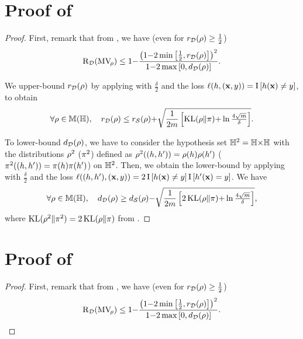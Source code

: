 \begin{noaddcontents}
\section{Proof of~}
\label{ap:mv:sec:proof-cbound-mcallester}

\theoremcboundmcallester*
\begin{proof}
First, remark that from , we have  (even for $r_{\D}(\Q)\ge \frac{1}{2}$) 
\begin{align*}
\Risk_{\D}(\MVQ) \le 1{-}\frac{\LP1{-}2\min\LB\frac{1}{2}, r_{\D}(\Q)\RB\RP^2}{1{-}2\max\LB 0, d_{\D}(\Q)\RB}.
\end{align*}

We upper-bound $r_{\D}(\Q)$ by applying  with $\frac{\delta}{2}$ and the loss $\loss(\h, (\x,\y)) = \indic\LB \h(\x)\ne \y\RB$, to obtain 
\begin{align*}
    \forall\Q\in\M(\H),\quad r_{\D}(\Q) \le r_{\dS}(\Q){+}\sqrt{\frac{1}{2\m}\LB \KL(\Q\|\P){+}\ln\tfrac{4\sqrt{m}}{\delta}\RB}.
\end{align*}

To lower-bound $d_{\D}(\Q)$, we have to consider the hypothesis set $\H^2 = \H{\times}\H$ with the distributions $\Q^2$ (\resp $\P^2$) defined as $\Q^2((\h, \h'))=\Q(\h)\Q(\h')$ (\resp $\P^2((\h, \h'))=\P(\h)\P(\h')$) on $\H^2$.
Then, we obtain the lower-bound by applying  with $\frac{\delta}{2}$ and the loss $\loss((\h, \h'), (\x,\y)) = 2\indic\LB \h(\x)\ne \y\RB\indic\LB \h'(\x)= \y\RB$.
We have
\begin{align*}
    \forall\Q\in\M(\H),\quad d_{\D}(\Q) \ge d_{\dS}(\Q){-}\sqrt{\frac{1}{2\m}\LB 2\KL(\Q\|\P){+}\ln\tfrac{4\sqrt{m}}{\delta}\RB},
\end{align*}
where $\KL(\Q^2\|\P^2)=2\KL(\Q\|\P)$ from .
\end{proof}

\section{Proof of~}
\label{ap:mv:sec:proof-cbound-seeger}

\theoremcboundseeger*
\begin{proof}
First, remark that from , we have (even for $r_{\D}(\Q)\ge \frac{1}{2}$) 
\begin{align*}
\Risk_{\D}(\MVQ) \le 1{-}\frac{\LP1{-}2\min\LB\frac{1}{2}, r_{\D}(\Q)\RB\RP^2}{1{-}2\max\LB 0, d_{\D}(\Q)\RB}.
\end{align*}


\end{proof}
\end{noaddcontents}
